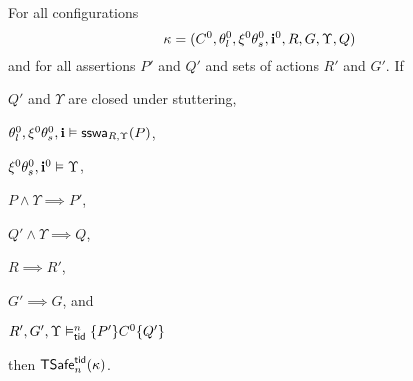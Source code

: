 \begin{lemma}[Conseq]\label{lem:Conseq}
For all configurations  
$$\kappa=(C^0,\theta^0_l,\xi^0\theta^0_s,\intp^0,R,G,\Upsilon, Q)$$
and for all assertions $P'$ and $Q'$ and sets of actions $R'$
and $G'$.
If 
\begin{compactenum}
\item \label{lem:conseq:stutter}
$Q'$ and $\Upsilon$ are closed under stuttering,
\item \label{lem:conseq:preP}
$\theta^0_l,\xi^0\theta^0_s,\intp\vDash \sswa{P}{R}{\Upsilon}$, 
\item \label{lem:conseq:preInv}
$\xi^0\theta^0_s,\intp^0\vDash \Upsilon$,
\item \label{lem:conseq:P}
$P \land \Upsilon \implies P'$,
\item \label{lem:conseq:Q}
$Q' \land \Upsilon \implies Q$,
\item \label{lem:conseq:R}
$R \implies R'$,
\item \label{lem:conseq:G}
$G' \implies G$, and 
\item \label{lem:conseq:safe}
$R',G',\Upsilon \vDash^n_{\ltid}  \{ P'\} C^0 \{Q'\}$
\end{compactenum}
then  
$\safe_n(\kappa)$.
\end{lemma}
